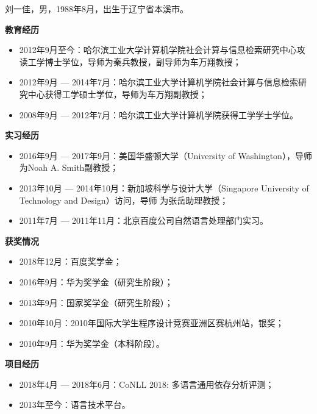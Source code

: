 
\begin{resume}
刘一佳，男，1988年8月，出生于辽宁省本溪市。

\textbf{教育经历}
\begin{itemize}
	\item 2012年9月至今：哈尔滨工业大学计算机学院社会计算与信息检索研究中心攻读工学博士学位，导师为秦兵教授，副导师为车万翔教授；
	\item 2012年9月 --- 2014年7月：哈尔滨工业大学计算机学院社会计算与信息检索研究中心获得工学硕士学位，导师为车万翔副教授；
	\item 2008年9月 --- 2012年7月：哈尔滨工业大学计算机学院获得工学学士学位。
\end{itemize}

\textbf{实习经历}
\begin{itemize}
	\item 2016年9月 --- 2017年9月：美国华盛顿大学（University of Washington），导师为Noah A. Smith副教授；
	\item 2013年10月 --- 2014年10月：新加坡科学与设计大学（Singapore University of Technology and Design）访问，导师
	为张岳助理教授；
	\item 2011年7月 --- 2011年11月：北京百度公司自然语言处理部门实习。
\end{itemize}

\textbf{获奖情况}

\begin{itemize}
	\item 2018年12月：百度奖学金；
	\item 2016年9月：华为奖学金（研究生阶段）；
	\item 2013年9月：国家奖学金（研究生阶段）；
	\item 2010年10月：2010年国际大学生程序设计竞赛亚洲区赛杭州站，银奖；
	\item 2010年9月：华为奖学金（本科阶段）。
\end{itemize}

\textbf{项目经历}

\begin{itemize}
	\item 2018年4月 --- 2018年6月：CoNLL 2018: 多语言通用依存分析评测；
	\item 2013年至今：语言技术平台。
\end{itemize}

\end{resume}
